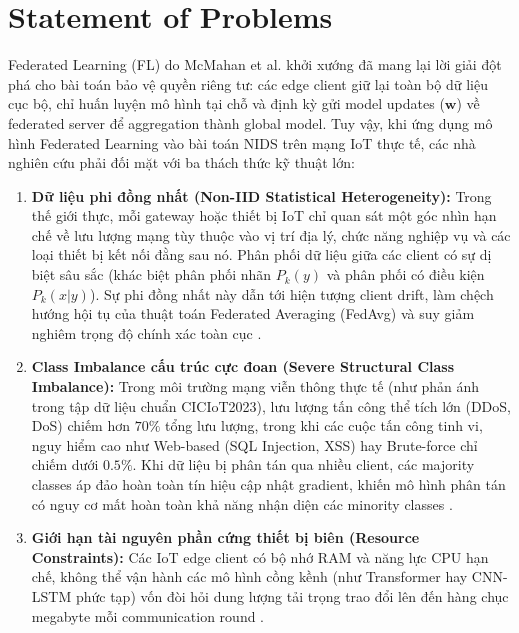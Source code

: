 \section{Statement of Problems}
\label{sec:intro_problems}
Federated Learning (FL) do McMahan et al. \cite{mcmahan2017communication} khởi xướng đã mang lại lời giải đột phá cho bài toán bảo vệ quyền riêng tư: các edge client giữ lại toàn bộ dữ liệu cục bộ, chỉ huấn luyện mô hình tại chỗ và định kỳ gửi model updates ($\mathbf{w}$) về federated server để aggregation thành global model. Tuy vậy, khi ứng dụng mô hình Federated Learning vào bài toán NIDS trên mạng IoT thực tế, các nhà nghiên cứu phải đối mặt với ba thách thức kỹ thuật lớn:
\begin{enumerate}
    \item \textbf{Dữ liệu phi đồng nhất (Non-IID Statistical Heterogeneity):} Trong thế giới thực, mỗi gateway hoặc thiết bị IoT chỉ quan sát một góc nhìn hạn chế về lưu lượng mạng tùy thuộc vào vị trí địa lý, chức năng nghiệp vụ và các loại thiết bị kết nối đằng sau nó. Phân phối dữ liệu giữa các client có sự dị biệt sâu sắc (khác biệt phân phối nhãn $P_k(y)$ và phân phối có điều kiện $P_k(x|y)$). Sự phi đồng nhất này dẫn tới hiện tượng client drift, làm chệch hướng hội tụ của thuật toán Federated Averaging (FedAvg) và suy giảm nghiêm trọng độ chính xác toàn cục \cite{li2020federated, hsu2019measuring}.
    \item \textbf{Class Imbalance cấu trúc cực đoan (Severe Structural Class Imbalance):} Trong môi trường mạng viễn thông thực tế (như phản ánh trong tập dữ liệu chuẩn CICIoT2023), lưu lượng tấn công thể tích lớn (DDoS, DoS) chiếm hơn $70\%$ tổng lưu lượng, trong khi các cuộc tấn công tinh vi, nguy hiểm cao như Web-based (SQL Injection, XSS) hay Brute-force chỉ chiếm dưới $0.5\%$. Khi dữ liệu bị phân tán qua nhiều client, các majority classes áp đảo hoàn toàn tín hiệu cập nhật gradient, khiến mô hình phân tán có nguy cơ mất hoàn toàn khả năng nhận diện các minority classes \cite{alahmari2025enhancing}.
    \item \textbf{Giới hạn tài nguyên phần cứng thiết bị biên (Resource Constraints):} Các IoT edge client có bộ nhớ RAM và năng lực CPU hạn chế, không thể vận hành các mô hình cồng kềnh (như Transformer hay CNN-LSTM phức tạp) vốn đòi hỏi dung lượng tải trọng trao đổi lên đến hàng chục megabyte mỗi communication round \cite{albanbay2025federated}.
\end{enumerate}


